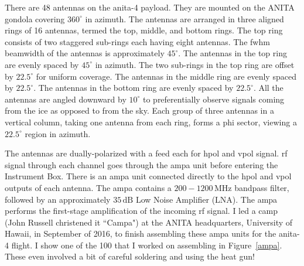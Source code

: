 There are 48 antennas on the \gls{anita}-4 payload.
They are mounted on the ANITA gondola covering $360^{\circ}$ in azimuth. 
The antennas are arranged in three aligned rings of 16 antennas, termed the top, middle, and bottom rings. 
The top ring consists of two staggered sub-rings each having eight antennas. 
The \gls{fwhm} beamwidth of the antennas is approximately $45^{\circ}$. 
The antennas in the top ring are evenly spaced by $45^{\circ}$ in azimuth. 
The two sub-rings in the top ring are offset by $22.5^{\circ}$ for uniform coverage.
The antennas in the middle ring are evenly spaced by $22.5^{\circ}$.
The antennas in the bottom ring are evenly spaced by $22.5^{\circ}$.
All the antennas are angled downward by $10^{\circ}$ to preferentially observe signals coming from the ice as opposed to from the sky. 
Each group of three antennas in a vertical column, taking one antenna from each ring, forms a phi sector, viewing a $22.5^{\circ}$ region in azimuth.

The antennas are dually-polarized with a feed each for \gls{hpol} and \gls{vpol} signal.
\gls{rf} signal through each channel goes through the 
\gls{ampa} unit before entering the Instrument Box. 
There is an \gls{ampa} unit connected directly to the \gls{hpol} and \gls{vpol} outputs of each antenna. 
The \gls{ampa} contains a $200 - 1200\,\mbox{MHz}$ bandpass filter, followed by an approximately $35\,\mathrm{dB}$ Low Noise Amplifier (LNA). The \gls{ampa} performs the first-stage amplification of the incoming \gls{rf} signal. I led a camp (John Russell christened it ``Campa") at the ANITA headquarters, University of Hawaii, in September of 2016, to finish assembling these \gls{ampa} units for the \gls{anita}-4 flight. I show one of the 100 that I worked on assembling in Figure~\ref{ampa}. These even involved a bit of careful soldering and using the heat gun!

